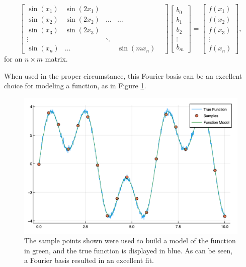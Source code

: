 \begin{equation} \label{eq:fourierBasis}
\begin{bmatrix}
\sin(x_1) & \sin(2x_1) \\
\sin(x_2) & \sin(2x_2) & \ldots & \ldots \\
\sin(x_3) & \sin(2x_3) \\
\vdots & & \ddots & & \\
\sin(x_n) & \ldots & & \sin(mx_n)
\end{bmatrix}
\begin{bmatrix}
b_0 \\
b_1 \\
b_2 \\
\vdots \\
b_m 
\end{bmatrix}
=
\begin{bmatrix}
f(x_1) \\ 
f(x_2) \\
f(x_3) \\ 
\vdots \\
f(x_n)
\end{bmatrix},
\end{equation}
for an $n\times m$ matrix.
\par When used in the proper circumstance, this Fourier basis can be an excellent choice for modeling a function, as in Figure \ref{fig:2dFourier}.

\begin{figure}[h]
\includegraphics[scale = 0.27]{Figures/2dFourier}
\caption{The sample points shown were used to build a model of the function in green, and the true function is displayed in blue. As can be seen, a Fourier basis resulted in an excellent fit. 
\label{fig:2dFourier}} 
\end{figure}

